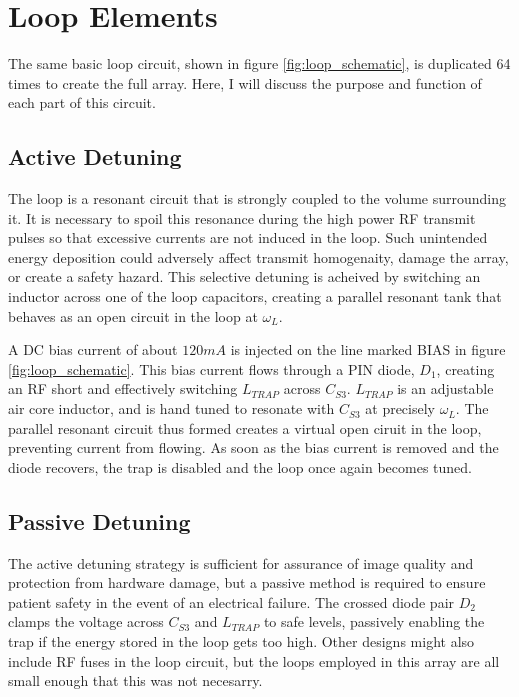 \chapter{Loop Elements}

The same basic loop circuit, shown in figure \ref{fig:loop_schematic}, is duplicated 64 times to create the full array.
Here, I will discuss the purpose and function of each part of this circuit.

\section{Active Detuning}
The loop is a resonant circuit that is strongly coupled to the volume surrounding it. It is necessary to spoil this
resonance during the high power RF transmit pulses so that excessive currents are not induced in the loop. Such
unintended energy deposition could adversely affect transmit homogenaity, damage the array, or create a safety hazard.
This selective detuning is acheived by switching an inductor across one of the loop capacitors, creating a parallel
resonant tank that behaves as an open circuit in the loop at $\omega_L$.

A DC bias current of about $120mA$ is injected on the line marked BIAS in figure \ref{fig:loop_schematic}. This bias
current flows through a PIN diode, $D_1$, creating an RF short and effectively switching $L_{TRAP}$ across $C_{S3}$.
$L_{TRAP}$ is an adjustable air core inductor, and is hand tuned to resonate with $C_{S3}$ at precisely $\omega_L$. The 
parallel resonant circuit thus formed creates a virtual open ciruit in the loop, preventing current from flowing. As 
soon as the bias current is removed and the diode recovers, the trap is disabled and the loop once again becomes tuned.

\section{Passive Detuning}
The active detuning strategy is sufficient for assurance of image quality and protection from hardware damage, but a
passive method is required to ensure patient safety in the event of an electrical failure. The crossed diode pair $D_2$
clamps the voltage across $C_{S3}$ and $L_{TRAP}$ to safe levels, passively enabling the trap if the energy stored in
the loop gets too high. Other designs might also include RF fuses in the loop circuit, but the loops employed in this
array are all small enough that this was not necesarry.

